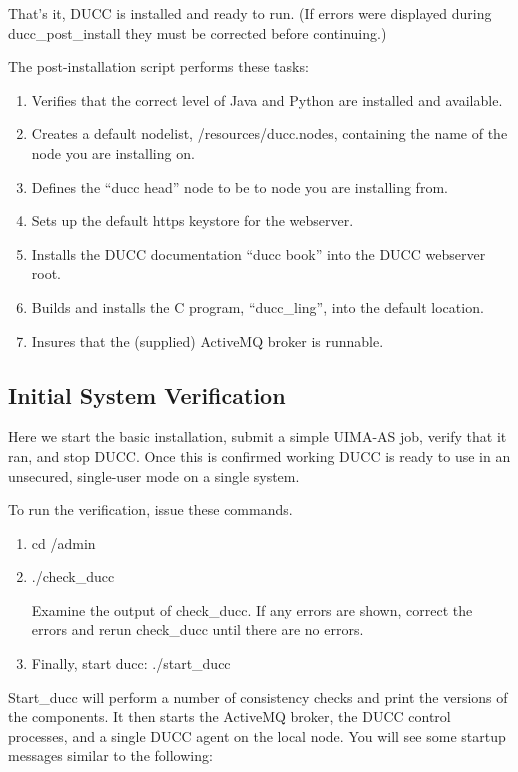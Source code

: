 That's it, DUCC is installed and ready to run. (If errors were displayed during ducc\_post\_install
they must be corrected before continuing.)

The post-installation script performs these tasks:
\begin{enumerate}
    \item Verifies that the correct level of Java and Python are installed and available.
    \item Creates a default nodelist, \duccruntime/resources/ducc.nodes, containing the name of the node you are installing on.
    \item Defines the ``ducc head'' node to be to node you are installing from.
    \item Sets up the default https keystore for the webserver.
    \item Installs the DUCC documentation ``ducc book'' into the DUCC webserver root.
    \item Builds and installs the C program, ``ducc\_ling'', into the default location.
    \item Insures that the (supplied) ActiveMQ broker is runnable.
\end{enumerate}

\subsection{Initial System Verification}

Here we start the basic installation, submit a simple UIMA-AS job, verify that it ran, and stop
DUCC.  Once this is confirmed working DUCC is ready to use in an unsecured, single-user mode on a
single system.

To run the verification, issue these commands.
\begin{enumerate}
  \item cd \duccruntime/admin 
  \item ./check\_ducc
  
    Examine the output of check\_ducc.  If any errors are shown, correct the errors and rerun
    check\_ducc until there are no errors.  
  \item Finally, start ducc: ./start\_ducc
  \end{enumerate}
  
  Start\_ducc will perform a number of consistency checks and print the versions of the components.
  It then starts the ActiveMQ broker, the DUCC control processes, and a single DUCC agent on the
  local node. You will see some startup messages similar to the following:

